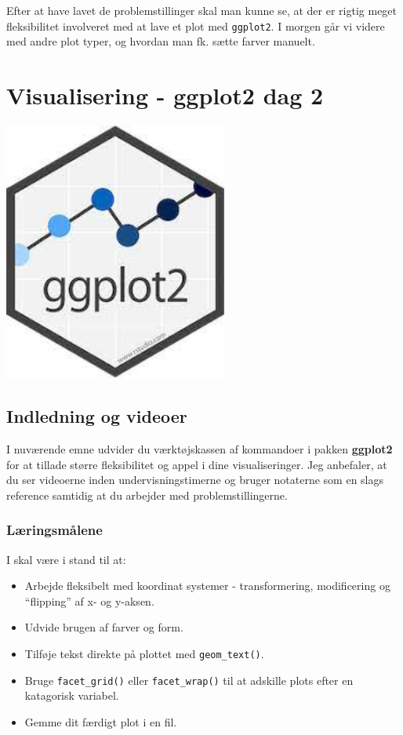 \documentclass[
]{book}
\providecommand{\tightlist}{%
  \setlength{\itemsep}{0pt}\setlength{\parskip}{0pt}}
\begin{document}
Efter at have lavet de problemstillinger skal man kunne se, at der er rigtig meget fleksibilitet involveret med at lave et plot med \texttt{ggplot2}. I morgen går vi videre med andre plot typer, og hvordan man fk. sætte farver manuelt.

\hypertarget{visual2}{%
\chapter{Visualisering - ggplot2 dag 2}\label{visual2}}

\includegraphics[width=2.9in]{plots/ggplot2_logo}

\hypertarget{indledning-og-videoer}{%
\section{Indledning og videoer}\label{indledning-og-videoer}}

I nuværende emne udvider du værktøjskassen af kommandoer i pakken \textbf{ggplot2} for at tillade større fleksibilitet og appel i dine visualiseringer. Jeg anbefaler, at du ser videoerne inden undervisningstimerne og bruger notaterne som en slags reference samtidig at du arbejder med problemstillingerne.

\hypertarget{luxe6ringsmuxe5lene}{%
\subsection{Læringsmålene}\label{luxe6ringsmuxe5lene}}

I skal være i stand til at:

\begin{itemize}
\tightlist
\item
  Arbejde fleksibelt med koordinat systemer - transformering, modificering og ``flipping'' af x- og y-aksen.
\item
  Udvide brugen af farver og form.
\item
  Tilføje tekst direkte på plottet med \texttt{geom\_text()}.
\item
  Bruge \texttt{facet\_grid()} eller \texttt{facet\_wrap()} til at adskille plots efter en katagorisk variabel.
\item
  Gemme dit færdigt plot i en fil.
\end{itemize}
\end{document}
